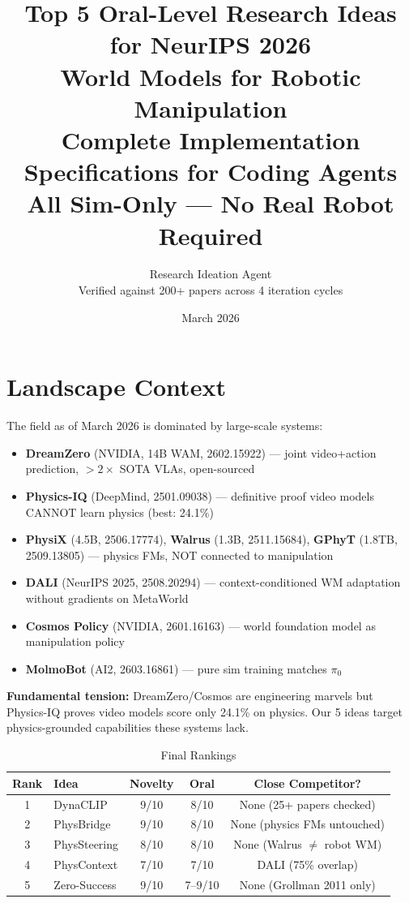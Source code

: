 \documentclass[11pt,a4paper]{article}
\title{\textbf{Top 5 Oral-Level Research Ideas for NeurIPS 2026}\\[5pt]
\large World Models for Robotic Manipulation\\[10pt]
\normalsize Complete Implementation Specifications for Coding Agents\\
\normalsize All Sim-Only --- No Real Robot Required}
\author{Research Ideation Agent\\
\small Verified against 200+ papers across 4 iteration cycles}
\date{March 2026}
\begin{document}
\maketitle
\tableofcontents
\newpage

\section{Landscape Context}

The field as of March 2026 is dominated by large-scale systems:
\begin{itemize}[nosep]
\item \textbf{DreamZero} (NVIDIA, 14B WAM, 2602.15922) --- joint video+action prediction, $>2\times$ SOTA VLAs, open-sourced
\item \textbf{Physics-IQ} (DeepMind, 2501.09038) --- definitive proof video models CANNOT learn physics (best: 24.1\%)
\item \textbf{PhysiX} (4.5B, 2506.17774), \textbf{Walrus} (1.3B, 2511.15684), \textbf{GPhyT} (1.8TB, 2509.13805) --- physics FMs, NOT connected to manipulation
\item \textbf{DALI} (NeurIPS 2025, 2508.20294) --- context-conditioned WM adaptation without gradients on MetaWorld
\item \textbf{Cosmos Policy} (NVIDIA, 2601.16163) --- world foundation model as manipulation policy
\item \textbf{MolmoBot} (AI2, 2603.16861) --- pure sim training matches $\pi_0$
\end{itemize}

\noindent\textbf{Fundamental tension:} DreamZero/Cosmos are engineering marvels but Physics-IQ proves video models score only 24.1\% on physics. Our 5 ideas target physics-grounded capabilities these systems lack.

\begin{table}[h]
\centering
\caption{Final Rankings}
\begin{tabular}{clccc}
\toprule
\textbf{Rank} & \textbf{Idea} & \textbf{Novelty} & \textbf{Oral} & \textbf{Close Competitor?} \\
\midrule
1 & DynaCLIP & 9/10 & 8/10 & None (25+ papers checked) \\
2 & PhysBridge & 9/10 & 8/10 & None (physics FMs untouched) \\
3 & PhysSteering & 8/10 & 8/10 & None (Walrus $\neq$ robot WM) \\
4 & PhysContext & 7/10 & 7/10 & DALI (75\% overlap) \\
5 & Zero-Success & 9/10 & 7--9/10 & None (Grollman 2011 only) \\
\bottomrule
\end{tabular}
\end{table}
\end{document}
